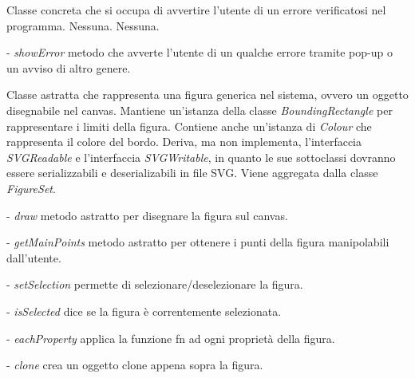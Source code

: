 Classe concreta che si occupa di avvertire l'utente di un errore verificatosi nel programma.
Nessuna.
Nessuna.
\begin{elencopuntato}[\normindent]
\item[-]  \textit{showError} metodo che avverte l'utente di un qualche errore tramite pop-up o un avviso di altro genere.
\end{elencopuntato}


Classe astratta che rappresenta una figura generica nel sistema, ovvero un oggetto disegnabile nel canvas.
Mantiene un'istanza della classe \textit{BoundingRectangle} per rappresentare i limiti della figura. Contiene anche un'istanza di \textit{Colour} che rappresenta il colore del bordo. Deriva, ma non implementa, l'interfaccia \textit{SVGReadable} e l'interfaccia \textit{SVGWritable}, in quanto le sue sottoclassi dovranno essere serializzabili e deserializabili in file SVG.
Viene aggregata dalla classe \textit{FigureSet}.
\begin{elencopuntato}[\normindent]
\item[-]  \textit{draw} metodo astratto per disegnare la figura sul canvas.
\item[-]  \textit{getMainPoints} metodo astratto per ottenere i punti della figura manipolabili dall'utente.
\item[-]  \textit{setSelection} permette di selezionare/deselezionare la figura.
\item[-]  \textit{isSelected} dice se la figura \`e correntemente selezionata.
\item[-]  \textit{eachProperty} applica la funzione fn ad ogni propriet\`a della figura.
\item[-]  \textit{clone} crea un oggetto clone appena sopra la figura.
\end{elencopuntato}

